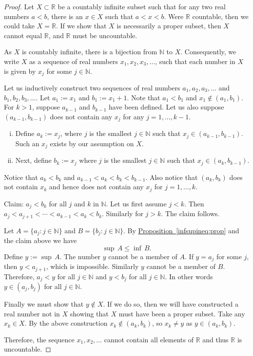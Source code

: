 \documentclass[12pt]{book}
\newcommand{\R}{{\mathbb{R}}}
\newcommand{\N}{{\mathbb{N}}}
\theoremstyle{plain}
\theoremstyle{remark}
\theoremstyle{definition}
\theoremstyle{exercise}
\theoremstyle{example}
\newcommand{\propref}[1]{\hyperref[#1]{Proposition~\ref*{#1}}}
\begin{document}
\begin{proof}
Let $X \subset \R$ be a countably infinite
subset such that for any two real numbers
$a < b$, there is an $x \in X$ such that $a < x < b$.  Were $\R$ countable,
then we could take $X = \R$.  If we show that $X$ is necessarily
a proper subset, then $X$ cannot equal $\R$, and $\R$ must be
uncountable.

As $X$ is countably infinite, 
there is a bijection from $\N$ to $X$.  Consequently, we write $X$ as
a sequence of real numbers $x_1, x_2, x_3,\ldots$, such that
each number in $X$
is given by $x_j$ for some $j \in \N$.

Let us inductively
construct two sequences of real numbers $a_1,a_2,a_3,\ldots$ and
$b_1,b_2,b_3,\ldots$.  Let
$a_1 := x_1$ and $b_1 := x_1+1$.  Note that $a_1 < b_1$ and
$x_1 \notin (a_1,b_1)$.
For $k > 1$, suppose $a_{k-1}$ and $b_{k-1}$ have been defined.
Let us also suppose $(a_{k-1},b_{k-1})$ does not contain any $x_j$
for any $j=1,\ldots,k-1$.
\begin{enumerate}[(i)]
\item Define $a_k := x_j$, where $j$ is the smallest $j \in \N$
such that $x_j \in (a_{k-1},b_{k-1})$.  Such an $x_j$ exists by our
assumption on $X$.  
\item Next, define $b_k := x_j$ where $j$ is the smallest $j \in \N$
such that $x_j \in (a_{k},b_{k-1})$.
\end{enumerate}
Notice that $a_k < b_k$ and $a_{k-1} < a_k < b_k < b_{k-1}$.
Also notice that $(a_{k},b_{k})$ does not contain $x_k$ and hence
does not contain any $x_j$ for $j=1,\ldots,k$.

Claim: $a_j < b_k$ for all $j$ and $k$ in $\N$.  Let us first
assume $j < k$.  Then $a_j < a_{j+1} < \cdots < a_{k-1} < a_k < b_k$.
Similarly for $j > k$.  The claim follows.

Let $A = \{ a_j : j \in \N \}$ and $B = \{ b_j : j \in \N \}$.
By \propref{infsupineq:prop} and the claim above we have
\begin{equation*}
\sup\, A \leq \inf\, B .
\end{equation*}
Define $y := \sup\, A$.  The number $y$ cannot be a member of $A$.  If $y = a_j$
for some $j$, then $y < a_{j+1}$, which is impossible.
Similarly $y$ cannot be a member of $B$.  Therefore,
$a_j < y$ for all $j\in \N$
and $y < b_j$ for all $j\in \N$.
In other words $y \in (a_j,b_j)$ for all $j\in \N$.

Finally we must show that $y \notin X$.  If we do so, then we will have
constructed a real number not in $X$ showing that $X$ must have been a
proper subset.  Take any $x_k \in X$.  By the above construction
$x_k \notin (a_k,b_k)$, so $x_k \not= y$ as $y \in (a_k,b_k)$.

Therefore, the sequence $x_1,x_2,\ldots$ cannot contain all elements of $\R$
and thus $\R$ is uncountable.
\end{proof}
\end{document}
